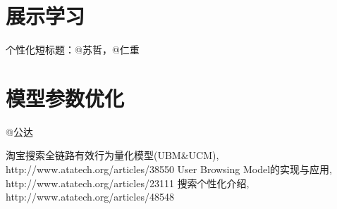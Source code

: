 \section{展示学习}
	个性化短标题：@苏哲，@仁重 

\section{模型参数优化} 
	@公达

\begin{thebibliography}{99}
 淘宝搜索全链路有效行为量化模型(UBM\&UCM), http://www.atatech.org/articles/38550
 User Browsing Model的实现与应用, http://www.atatech.org/articles/23111
 搜索个性化介绍, http://www.atatech.org/articles/48548
\end{thebibliography}

 

